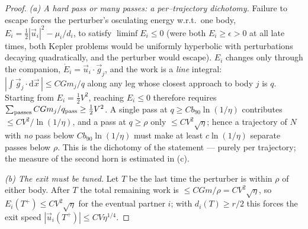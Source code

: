 \documentclass[11pt]{article}
\newcommand{\dd}{\mathrm{d}}
\begin{document}
\begin{proof}
\emph{(a) A hard pass or many passes: a per--trajectory dichotomy.} Failure to escape forces the
perturber's osculating energy
w.r.t.\ one body, $E_i=\tfrac12|\vec u_i|^2-\mu_i/d_i$, to satisfy $\liminf E_i\le0$ (were both
$E_i\ge\epsilon>0$ at all late times, both Kepler problems would be uniformly hyperbolic with
perturbations decaying quadratically, and the perturber would escape). $E_i$ changes only through
the companion, $\dot E_i=\vec u_i\cdot\vec g_j$, and the work is a \emph{line} integral:
$|\!\int\vec g_j\cdot\dd\vec x\,|\le CGm_j/q$ along any leg whose closest approach to body $j$ is
$q$. Starting from $E_i=\tfrac12V^2$, reaching $E_i\le0$ therefore requires
$\sum_{\rm passes}CGm_j/q_{\rm pass}\ge\tfrac12V^2$. A single pass at
$q\ge Cb_{90}\ln(1/\eta)$ contributes $\le CV^2/\ln(1/\eta)$, and a pass at $q\ge\rho$ only
$\le CV^2\sqrt\eta$; hence a trajectory of $N$ with \emph{no} pass below $Cb_{90}\ln(1/\eta)$
must make at least $c\ln(1/\eta)$ separate passes below $\rho$. This is the dichotomy of the
statement --- purely per trajectory; the measure of the second horn is estimated in (c).

\emph{(b) The exit must be tuned.} Let $T$ be the last time the perturber is within $\rho$ of
either body. After $T$ the total remaining work is $\le CGm/\rho=CV^2\sqrt\eta$, so
$E_i(T^+)\le CV^2\sqrt\eta$ for the eventual partner $i$; with $d_i(T)\ge r/2$ this forces the exit
speed $|\vec u_i(T^+)|\le CV\eta^{1/4}$.


\end{proof}
\end{document}
